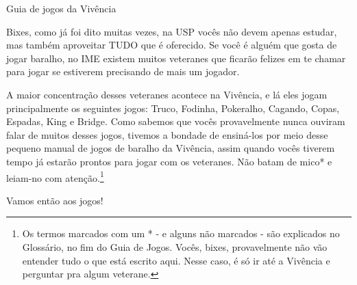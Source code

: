 \begin{secao}{Guia de jogos da Vivência}

Bixes, como já foi dito muitas vezes, na USP vocês não devem apenas estudar, mas
também aproveitar TUDO que é oferecido. Se você é alguém que gosta de jogar
baralho, no IME existem muitos veteranes que ficarão felizes em te chamar para
jogar se estiverem precisando de mais um jogador.

A maior concentração desses veteranes acontece na Vivência, e lá eles jogam
principalmente os seguintes jogos: Truco, Fodinha, Pokeralho, Cagando, Copas,
Espadas, King e Bridge. Como sabemos que vocês provavelmente nunca ouviram falar de
muitos desses jogos, tivemos a bondade de ensiná-los por meio desse pequeno manual
de jogos de baralho da Vivência, assim quando vocês tiverem tempo já estarão
prontos para jogar com os veteranes. Não batam de mico* e leiam-no com
atenção.\footnote{Os termos marcados com um * - e alguns não marcados - são
explicados no Glossário, no fim do Guia de Jogos. Vocês, bixes, provavelmente não
vão entender tudo o que está escrito aqui. Nesse caso, é só ir até a Vivência e
perguntar pra algum veterane.}

Vamos então aos jogos!











\end{secao}

